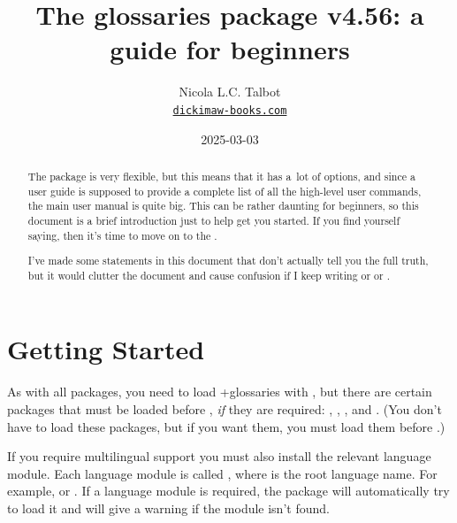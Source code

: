 \documentclass[titlepage=false,oneside,
 fontsize=12pt,captions=tableheading]{scrarticle}
\title{The glossaries package v4.56: 
a guide for beginners}
\author{Nicola L.C. Talbot\\\href{https://www.dickimaw-books.com/}{\nolinkurl{dickimaw-books.com}}}
\date{2025-03-03}
\begin{document}
\maketitle

\begin{abstract}
The  package is very flexible, but this means
that it has a~lot of options, and since a user guide is supposed to
provide a complete list of all the high-level user commands, the main
user manual is quite big. This can be rather
daunting for beginners, so this document is a brief introduction
just to help get you started. If you find yourself saying, 
 then it's time to move on to the 
.

I've made some statements in this document that don't actually tell
you the full truth, but it would clutter the document and cause
confusion if I keep writing  or  or .
\end{abstract}

\tableofcontents

\section{Getting Started}
\label{sec:start}

As with all packages, you need to load \sty+{glossaries} with
, but there are certain packages that must be loaded
before , \emph{if} they are required: ,
, ,  and .
(You don't have to load these packages, but if you want them, you
must load them before .)

\begin{important}
If you require multilingual support you must also install 
the relevant language module. Each language module is called
, where  is the
root language name. For example, 
or . If a language module is required,
the  package will automatically try to load it
and will give a warning if the module isn't found.
\end{important}
\end{document}

